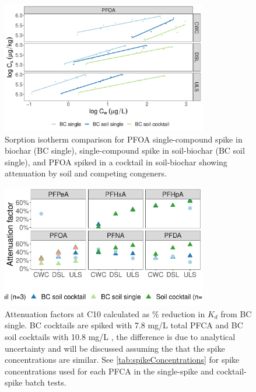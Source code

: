 \begin{figure}[htb]
    \centering
    \includegraphics[width=0.8\textwidth]{R/figs/Attenuation_isotherms_PFOA.pdf}
    \caption{Sorption isotherm comparison for PFOA single-compound spike in biochar (BC single), single-compound spike in soil-biochar (BC soil single), and PFOA spiked in a cocktail in soil-biochar showing attenuation by soil and competing congeners.}
    \label{fig:PFOA_attenuation}
\end{figure}

\begin{figure}[htb]
    \centering
    \includegraphics[width=0.8\textwidth]{R/figs/Attenuation_factors_C10.pdf}
    \caption{Attenuation factors at C10 calculated as \% reduction in $K_d$ from BC single. BC cocktails are spiked with 7.8 mg/L total PFCA and BC soil cocktails with 10.8 mg/L , the difference is due to analytical uncertainty and will be discussed assuming the that the spike concentrations are similar. See \cref{tab:spikeConcentrations} for spike concentrations used for each PFCA in the single-spike and cocktail-spike batch tests.}
    \label{fig:attenuation_factors}
\end{figure}


